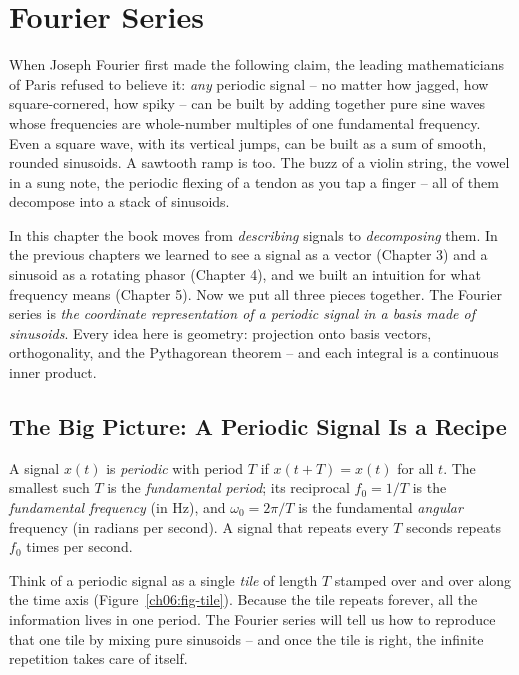 \chapter{Fourier Series}

When Joseph Fourier first made the following claim, the leading
mathematicians of Paris refused to believe it: \emph{any}
periodic signal -- no matter how jagged, how square-cornered, how spiky -- can be built
by adding together pure sine waves whose frequencies are whole-number multiples of one
fundamental frequency. Even a square wave, with its vertical jumps, can be built as a
sum of smooth, rounded sinusoids. A sawtooth ramp is too. The buzz of a violin string,
the vowel in a sung note, the periodic flexing of a tendon as you tap a finger -- all of
them decompose into a stack of sinusoids.

In this chapter the book moves from \emph{describing} signals to
\emph{decomposing} them. In the previous chapters we learned to see a signal as a vector
(Chapter 3) and a sinusoid as a rotating phasor (Chapter 4), and we built an intuition
for what frequency means (Chapter 5). Now we put all three pieces together. The Fourier
series is \emph{the coordinate representation of a periodic signal in a basis made of
sinusoids}. Every idea here is geometry: projection onto basis vectors, orthogonality, and
the Pythagorean theorem -- and each integral is a continuous inner product.

\chapterline

\section{The Big Picture: A Periodic Signal Is a Recipe}

A signal \(x(t)\) is \emph{periodic} with period \(T\) if
\(x(t+T) = x(t)\) for all \(t\). The smallest such \(T\) is the \emph{fundamental
period}; its reciprocal \(f_0 = 1/T\) is the \emph{fundamental frequency} (in Hz), and
\(\omega_0 = 2\pi/T\) is the fundamental \emph{angular} frequency (in radians per second).
A signal that repeats every \(T\) seconds repeats $f_0$ times per second.

\begin{intuitionbox}
Think of a periodic signal as a single \emph{tile} of length \(T\) stamped over and over
along the time axis (Figure~\ref{ch06:fig-tile}). Because the tile repeats forever, all the information lives in one
period. The Fourier series will tell us how to reproduce that one tile by mixing pure
sinusoids -- and once the tile is right, the infinite repetition takes care of itself.
\end{intuitionbox}

